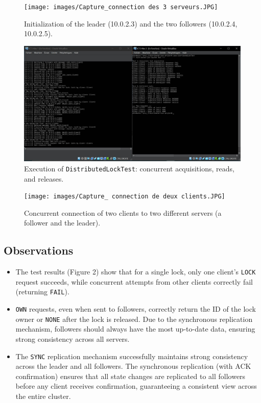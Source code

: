 \documentclass[a4paper,11pt]{article}
\begin{document}
\begin{figure}[H]
\centering
\texttt{[image: images/Capture\_connection des 3 serveurs.JPG]}
\caption{Initialization of the leader (10.0.2.3) and the two followers (10.0.2.4, 10.0.2.5).}
\end{figure}

\begin{figure}[H]
\centering
\includegraphics[width=0.9\linewidth]{images/Capture_distributed_lock_test.JPG}
\caption{Execution of \texttt{DistributedLockTest}: concurrent acquisitions, reads, and releases.}
\end{figure}

\begin{figure}[H]
\centering
\texttt{[image: images/Capture\_ connection de deux clients.JPG]}
\caption{Concurrent connection of two clients to two different servers (a follower and the leader).}
\end{figure}

\subsection*{Observations}
\begin{itemize}
    \item The test results (Figure 2) show that for a single lock, only one client's \texttt{LOCK} request succeeds, while concurrent attempts from other clients correctly fail (returning \texttt{FAIL}).
    \item \texttt{OWN} requests, even when sent to followers, correctly return the ID of the lock owner or \texttt{NONE} after the lock is released. Due to the synchronous replication mechanism, followers should always have the most up-to-date data, ensuring strong consistency across all servers.
    \item The \texttt{SYNC} replication mechanism successfully maintains strong consistency across the leader and all followers. The synchronous replication (with ACK confirmation) ensures that all state changes are replicated to all followers before any client receives confirmation, guaranteeing a consistent view across the entire cluster.
\end{itemize}
\end{document}
